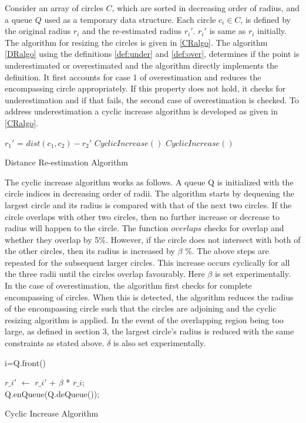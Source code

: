 \documentclass[twocolumn]{svjour3}
\begin{document}
Consider an array of circles $C$, which are sorted in decreasing order of radius, and a queue $Q$ used as a temporary data structure. Each circle $c_i \in C$, is defined by the original radius $r_i$ and the re-estimated radius $r_i'$.  $r_i'$ is same as  $r_i$ initially. The algorithm for resizing the circles is given in \ref{CRalgo}. 
The algorithm \ref{DRalgo} using the definitions \ref{def:under} and \ref{def:over}, determines if the point is underestimated or overestimated and the algorithm directly implements the definition. It first accounts for case 1 of overestimation and reduces the encompassing circle appropriately. If this property does not hold, it checks for underestimation and if that fails, the second case of overestimation is checked. To address underestimation a cyclic increase algorithm is developed as given in \ref{CRalgo}. 

\begin{algorithm}[!ht]
\SetAlgoLined
{}
{
	$r_1'$ = $dist({c_1,c_2}) - r_2' $\;
	$CyclicIncrease()$ \; 
} 
{
	$CyclicIncrease()$ \;
}
\caption{Distance Re-estimation Algorithm}
\label{DRalgo}
\end{algorithm}
The cyclic increase algorithm works as follows. A queue Q is initialized with the circle indices in decreasing order of radii. The algorithm starts by dequeuing the largest circle and its radius is compared with that of the next two circles. If the circle overlaps with other two circles, then no further increase or decrease to radius will happen to the circle. The function $overlaps$ checks for overlap and whether they overlap by 5\%. However, if the circle does not intersect with both of the other circles, then its radius is increased by $\beta$ \%. The above steps are repeated for the subsequent larger circles. This increase occurs cyclically for all the three radii until the circles overlap favourably. Here $\beta$ is set experimentally.
In the case of overestimation, the algorithm first checks for complete encompassing of circles. When this is detected, the algorithm reduces the radius of the encompassing circle such that the circles are adjoining and the cyclic resizing algorithm is applied. In the event of the overlapping region being too large, as defined in section 3, the largest circle's radius is reduced with the same constraints as stated above. $\delta$ is also set experimentally.
\begin{algorithm}[!ht]
\SetAlgoLined
{}
{
	i=Q.front()\;
	{
		$r\_i'$ $\leftarrow$ $r\_i'$ + $\beta$ * $r\_i$; \\
	    Q.enQueue(Q.deQueue());

	}
	
}
\caption{Cyclic Increase Algorithm}
\label{CRalgo}
\end{algorithm}
\vspace{-0.2in}
\end{document}

